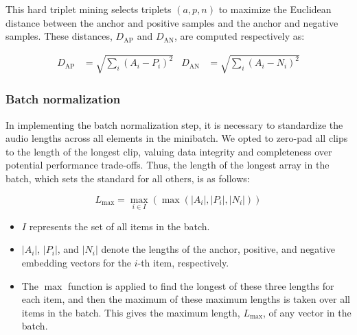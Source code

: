This hard triplet mining selects triplets $(a, p, n)$ to maximize the Euclidean distance between the anchor and positive samples and the anchor and negative samples. These distances, $D_{\text{AP}}$ and $D_{\text{AN}}$, are computed respectively as:


\begin{align}
D_{\text{AP}} &= \sqrt{\sum_{i} (A_i - P_i)^2} & D_{\text{AN}} &= \sqrt{\sum_{i} (A_i - N_i)^2}
\end{align}


\subsubsection{Batch normalization}

In implementing the batch normalization step, it is necessary to standardize the audio lengths across all elements in the minibatch. We opted to zero-pad all clips to the length of the longest clip, valuing data integrity and completeness over potential performance trade-offs. Thus, the length of the longest array in the batch, which sets the standard for all others, is as follows:

\begin{equation}
L_{\text{max}} = \max_{i \in I} \left( \max \left( |A_i|, |P_i|, |N_i| \right) \right)
\end{equation}

\begin{itemize}
    \item $I$ represents the set of all items in the batch.
    \item $|A_i|$, $|P_i|$, and $|N_i|$ denote the lengths of the anchor, positive, and negative embedding vectors for the $i$-th item, respectively.
    \item The $\max$ function is applied to find the longest of these three lengths for each item, and then the maximum of these maximum lengths is taken over all items in the batch. This gives the maximum length, $L_{\text{max}}$, of any vector in the batch.
    \end{itemize}

\newpage